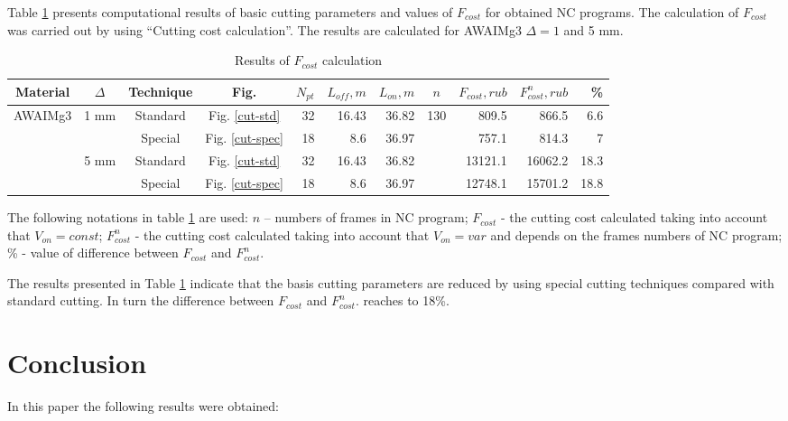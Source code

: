 \documentclass[runningheads]{llncs}
\begin{document}
Table \ref{f-cost}
presents computational results of basic cutting parameters and values of $F_{cost}$
for obtained NC programs.
The calculation of $F_{cost}$
was carried out by using ``Cutting cost calculation''.
The results are calculated for AWAIMg3 $\Delta = 1$ and 5 mm.

\begin{table}
  \begin{tabular}{c | c | c | c | r r r | c | r r | r}
  Material & $\Delta$ & Technique & Fig. & $N_{pt}$ & $L_{off}, m$ & $L_{on}, m$ & $n$ & $F_{cost}, rub$ & $F^n_{cost}, rub$ & \% \\
  \hline \hline
  \multirow{4}{*}{AWAIMg3} & \multirow{2}{*}{1 mm} & Standard & Fig. \ref{cut-std}     & 32  & 16.43   & 36.82 & \multirow{4}{*}{130} & 809.5 & 866.5 & 6.6 \\
                         &                    & Special  & Fig. \ref{cut-spec} & 18  & 8.6  & 36.97 &                      & 757.1 & 814.3 & 7 \\
                         & \multirow{2}{*}{5 mm} & Standard & Fig. \ref{cut-std}  & 32 & 16.43 & 36.82 &                    & 13121.1 & 16062.2 & 18.3 \\
                         &                    & Special  & Fig. \ref{cut-spec}  & 18 & 8.6 & 36.97 &                      & 12748.1 & 15701.2 & 18.8 \\
  \hline
  \end{tabular}
  \caption{Results of $F_{cost}$ calculation}
  \label{f-cost}
\end{table}

The following notations in table \ref{f-cost}
are used:
$n$ – numbers of frames in NC program;
$F_{cost}$ - the cutting cost calculated taking into account that $V_{on}=const$;
$F^n_{cost}$ - the cutting cost calculated taking into account that $V_{on}=var$
and depends on the frames numbers of NC program;
\% - value of difference between
$F_{cost}$
and
$F^n_{cost}$.

The results presented in Table \ref{f-cost} indicate that
the basis cutting parameters are reduced by using special cutting techniques
compared with standard cutting.
In turn the difference between
$F_{cost}$
and
$F^n_{cost}$.
reaches to 18\%.

\section{Conclusion}

In this paper the following results were obtained:
\end{document}
